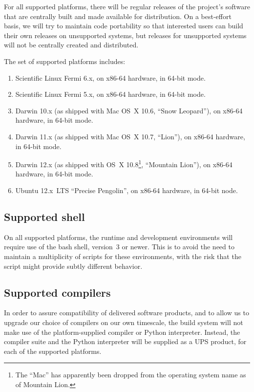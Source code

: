 \documentclass[draftmode,draftwater]{memarticle}
\begin{document}
For all supported platforms, there will be regular releases of the
project's software that are centrally built and made available for
distribution. On a best-effort basis, we will try to maintain code
portability so that interested users can build their own releases on
unsupported systems, but releases for unsupported systems will not be
centrally created and distributed.

The set of supported platforms includes:
\begin{enumerate}
\item Scientific Linux Fermi 6.x, on x86-64 hardware, in 64-bit mode.
\item Scientific Linux Fermi 5.x, on x86-64 hardware, in 64-bit mode.
\item Darwin 10.x (as shipped with Mac OS~X 10.6, ``Snow Leopard''), on
  x86-64 hardware, in 64-bit mode.
\item Darwin 11.x (as shipped with Mac OS~X 10.7, ``Lion''), on x86-64
  hardware, in 64-bit mode.
\item Darwin 12.x (as shipped with OS~X 10.8\footnote{The ``Mac'' has
    apparently been dropped from the operating system name as of
    Mountain Lion.}, ``Mountain Lion''), on x86-64 hardware, in 64-bit
  mode.
\item Ubuntu 12.x~LTS ``Precise Pengolin'', on x86-64 hardware, in
  64-bit node.
\end{enumerate}

\subsection{Supported shell}

On all supported platforms, the runtime and development environments
will require use of the bash shell, version~3 or newer. This is to avoid
the need to maintain a multiplicity of scripts for these environments,
with the risk that the script might provide subtly different behavior.

\subsection{Supported compilers}

In order to assure compatibility of delivered software products, and to
allow us to upgrade our choice of compilers on our own timescale, the
build system will not make use of the platform-supplied compiler or
Python interpreter. Instead, the compiler suite and the Python
interpreter will be supplied as a UPS product, for each of the supported
platforms.
\end{document}
